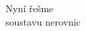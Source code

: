 \documentclass[preview]{standalone}
\begin{document}
\begin{center}
Nyní řešme \\ soustavu nerovnic
\end{center}
\end{document}
